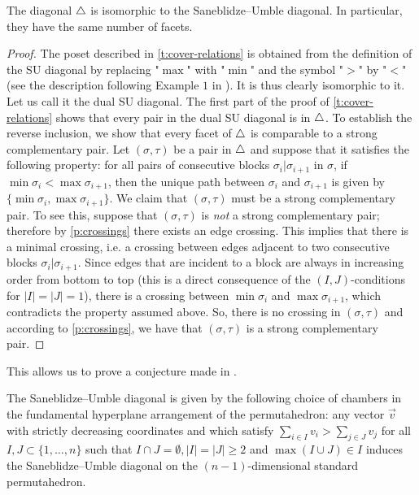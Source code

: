 \begin{proposition}
\label{p:iso-with-SU}
The diagonal $\triangle$ is isomorphic to the Saneblidze--Umble diagonal.
In particular, they have the same number of facets. 
\end{proposition}


\begin{proof}
The poset described in \cref{t:cover-relations} is obtained from the definition of the SU diagonal by replacing "$\max$" with "$\min$" and the symbol "$>$" by "$<$" (see the description following Example $1$ in \cite{saneblidzeComparingDiagonalsAssociahedra2022}).
It is thus clearly isomorphic to it. 
Let us call it the dual SU diagonal. 
The first part of the proof of \cref{t:cover-relations} shows that every pair in the dual SU diagonal is in $\triangle$. 
To establish the reverse inclusion, we show that every facet of $\triangle$ is comparable to a strong complementary pair.
Let $(\sigma,\tau)$ be a pair in $\triangle$ and suppose that it satisfies the following property: for all pairs of consecutive blocks $\sigma_i | \sigma_{i+1}$ in $\sigma$, if $\min \sigma_i < \max \sigma_{i+1}$, then the unique path between $\sigma_i$ and $\sigma_{i+1}$ is given by $\{\min \sigma_i, \max \sigma_{i+1}\}$. 
We claim that $(\sigma,\tau)$ must be a strong complementary pair. 
To see this, suppose that $(\sigma,\tau)$ is \emph{not} a strong complementary pair; therefore by \cref{p:crossings} there exists an edge crossing. 
This implies that there is a minimal crossing, i.e. a crossing between edges adjacent to two consecutive blocks $\sigma_i | \sigma_{i+1}$. 
Since edges that are incident to a block are always in increasing order from bottom to top (this is a direct consequence of the $(I,J)$-conditions for $|I|=|J|=1$), there is a crossing between $\min \sigma_i$ and $\max \sigma_{i+1}$, which contradicts the property assumed above. 
So, there is no crossing in $(\sigma,\tau)$ and according to \cref{p:crossings}, we have that $(\sigma,\tau)$ is a strong complementary pair. 
\end{proof}

This allows us to prove a conjecture made in \cite[Remark 3.19]{LA21}.

\begin{corollary}
    The Saneblidze--Umble diagonal is given by the following choice of chambers in the fundamental hyperplane arrangement of the permutahedron: any vector $\vec v$ with strictly decreasing coordinates and which satisfy $\sum_{i \in I} v_i > \sum_{j \in J} v_j$ for all $I,J \subset \{1, \ldots, n\}$ such that $I \cap J = \emptyset, |I|=|J| \geq 2$ and $\max(I \cup J) \in I$ induces the Saneblidze--Umble diagonal on the $(n-1)$-dimensional standard permutahedron. 
\end{corollary}

